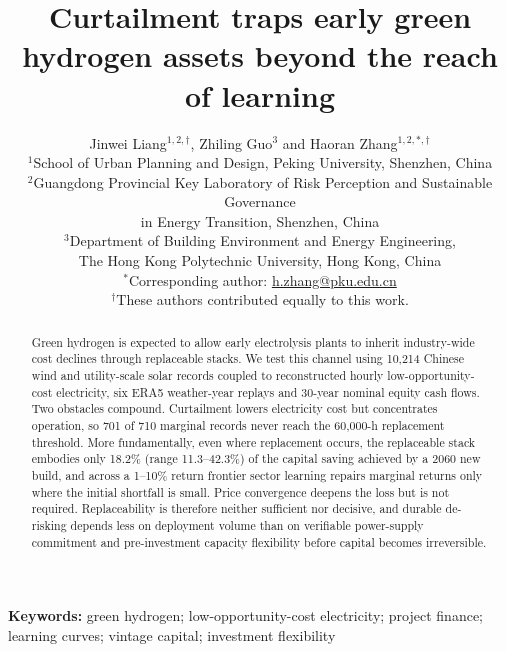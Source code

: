 \documentclass[11pt,a4paper]{article}
\begin{document}
\title{Curtailment traps early green hydrogen assets beyond the reach of learning}
\author{Jinwei Liang$^{1,2,\dagger}$, Zhiling Guo$^{3}$ and Haoran Zhang$^{1,2,*,\dagger}$\\[0.65em]
\small $^{1}$School of Urban Planning and Design, Peking University, Shenzhen, China\\
\small $^{2}$Guangdong Provincial Key Laboratory of Risk Perception and Sustainable Governance\\
\small in Energy Transition, Shenzhen, China\\
\small $^{3}$Department of Building Environment and Energy Engineering,\\
\small The Hong Kong Polytechnic University, Hong Kong, China\\[0.45em]
\small $^{*}$Corresponding author: \href{mailto:h.zhang@pku.edu.cn}{h.zhang@pku.edu.cn}\\
\small $^{\dagger}$These authors contributed equally to this work.}
\date{}

\maketitle
\linenumbers

\begin{abstract}
Green hydrogen is expected to allow early electrolysis plants to inherit industry-wide cost declines through replaceable stacks. We test this channel using 10,214 Chinese wind and utility-scale solar records coupled to reconstructed hourly low-opportunity-cost electricity, six ERA5 weather-year replays and 30-year nominal equity cash flows. Two obstacles compound. Curtailment lowers electricity cost but concentrates operation, so 701 of 710 marginal records never reach the 60,000-h replacement threshold. More fundamentally, even where replacement occurs, the replaceable stack embodies only 18.2\% (range 11.3--42.3\%) of the capital saving achieved by a 2060 new build, and across a 1--10\% return frontier sector learning repairs marginal returns only where the initial shortfall is small. Price convergence deepens the loss but is not required. Replaceability is therefore neither sufficient nor decisive, and durable de-risking depends less on deployment volume than on verifiable power-supply commitment and pre-investment capacity flexibility before capital becomes irreversible.
\end{abstract}

\noindent\textbf{Keywords:} green hydrogen; low-opportunity-cost electricity; project finance; learning curves; vintage capital; investment flexibility
\vspace{1em}
\end{document}

